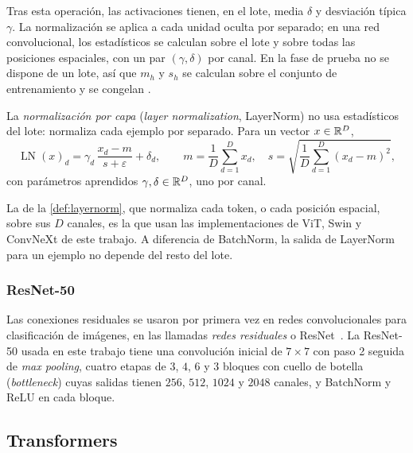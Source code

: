Tras esta operación, las activaciones tienen, en el lote, media $\delta$ y
desviación típica $\gamma$. La normalización se aplica a cada unidad oculta por
separado; en una red convolucional, los estadísticos se calculan sobre el lote y
sobre todas las posiciones espaciales, con un par $(\gamma,\delta)$ por canal. En
la fase de prueba no se dispone de un lote, así que $m_h$ y $s_h$ se calculan
sobre el conjunto de entrenamiento y se congelan
\cite[sec.~11.4]{prince2023understanding}.

\begin{definicion}\label{def:layernorm}
La \emph{normalización por capa} (\emph{layer normalization}, LayerNorm) no usa
estadísticos del lote: normaliza cada ejemplo por separado. Para un vector
$x\in\mathbb{R}^{D}$,
\[
  \operatorname{LN}(x)_d = \gamma_d\,\frac{x_d - m}{s + \varepsilon} + \delta_d,
  \qquad
  m = \frac{1}{D}\sum_{d=1}^{D} x_d, \quad
  s = \sqrt{\frac{1}{D}\sum_{d=1}^{D} (x_d - m)^2},
\]
con parámetros aprendidos $\gamma,\delta\in\mathbb{R}^{D}$, uno por canal.
\end{definicion}
La de la \cref{def:layernorm}, que normaliza cada token, o
cada posición espacial, sobre sus $D$ canales, es la que usan las implementaciones
de ViT, Swin y ConvNeXt de este trabajo. A diferencia de BatchNorm, la salida de
LayerNorm para un ejemplo no depende del resto del lote.

\subsubsection{ResNet-50}\label{sec:resnet}

Las conexiones residuales se usaron por primera vez en redes convolucionales para
clasificación de imágenes, en las llamadas \emph{redes residuales} o
ResNet~\cite{he2016}. La ResNet-50 usada en este trabajo tiene una convolución
inicial de $7\times7$ con paso 2 seguida de \emph{max pooling}, cuatro etapas de
$3$, $4$, $6$ y $3$ bloques con cuello de botella (\emph{bottleneck}) cuyas
salidas tienen $256$, $512$, $1024$ y $2048$ canales, y BatchNorm y ReLU en cada
bloque.

\subsection{Transformers}\label{sec:transformer}

